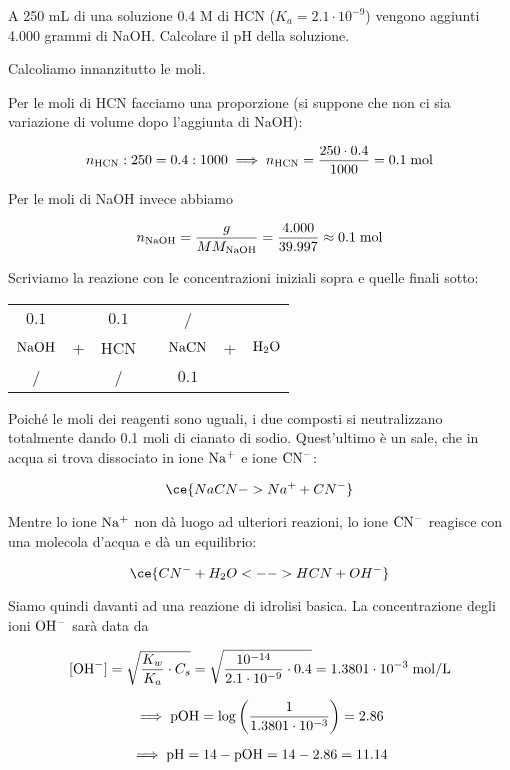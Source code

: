 \begin{esercizio}
    A 250 mL di una soluzione 0.4 M di HCN ($K_a = 2.1 \cdot 10^{-9}$) vengono aggiunti 4.000 grammi di NaOH. Calcolare il pH della soluzione.
\end{esercizio}
\begin{soluzione}

Calcoliamo innanzitutto le moli.

Per le moli di HCN facciamo una proporzione (si suppone che non ci sia variazione di volume dopo l'aggiunta di NaOH):

$$n_{\rm HCN}:250=0.4:1000
\implies
n_{\rm HCN}=\frac{250 \cdot 0.4}{1000}=0.1 \; \rm mol$$

Per le moli di NaOH invece abbiamo

$$n_{\rm NaOH}=\frac{g}{MM_{\rm NaOH}}
=\frac{4.000}{39.997} \approx 0.1 \; \rm mol$$

Scriviamo la reazione con le concentrazioni iniziali sopra e quelle finali sotto:

\begin{center}
    \begin{tabular}{ccccccc}
        $0.1$ &  & $0.1$ & & / &&\\
        $\rm NaOH$ & + & HCN & \ce{->} & $\rm NaCN$ & + & $\rm H_2O$\\
        / &  &  / & & $0.1$ &&\\
    \end{tabular}
\end{center}

Poiché le moli dei reagenti sono uguali, i due composti si neutralizzano totalmente dando 0.1 moli di cianato di sodio. Quest'ultimo è un sale, che in acqua si trova dissociato in ione $\rm Na^+$ e ione $\rm CN^-$:

$$\ce{NaCN -> Na^+ + CN^-}$$

Mentre lo ione $\rm Na^+$ non dà luogo ad ulteriori reazioni, lo ione $\rm CN^-$ reagisce con una molecola d'acqua e dà un equilibrio:

$$\ce{CN^- + H_2O <--> HCN + OH^-}$$

Siamo quindi davanti ad una reazione di idrolisi basica. La concentrazione degli ioni $\rm OH^-$ sarà data da

$$[\text{OH}^-]
=\sqrt{\frac{K_w}{K_a}\cdot C_s}
=\sqrt{\frac{10^{-14}}{2.1 \cdot 10^{-9}} \cdot 0.4}
=1.3801 \cdot 10^{-3} \; \rm mol/L$$

$$\implies \rm pOH
=\log{\left(\frac{1}{1.3801 \cdot 10^{-3}}\right)}
=2.86$$

$$\implies \rm pH=14-pOH=14-2.86=11.14$$
\end{soluzione}

